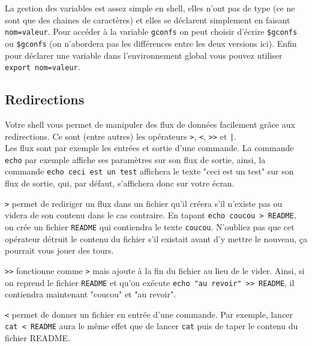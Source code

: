 \documentclass{article}
\begin{document}
La gestion des variables est assez simple en shell, elles n'ont pas de type (ce ne sont que des chaines de caractères) et elles se déclarent simplement en faisant \texttt{nom=valeur}.
Pour accéder à la variable \texttt{gconfs} on peut choisir d'écrire \texttt{\$gconfs} ou \texttt{\${gconfs}} (on n'abordera pas les différences entre les deux versions ici).
Enfin pour déclarer une variable dans l'environnement global vous pouvez utiliser \texttt{export nom=valeur}.

\subsection{Redirections}

Votre shell vous permet de manipuler des flux de données facilement grâce aux redirections.
Ce sont (entre autres) les opérateurs \texttt{>}, \texttt{<}, \texttt{>>} et \texttt{|}.\\

Les flux sont par exemple les entrées et sortie d'une commande. La commande \texttt{echo} par exemple affiche ses paramètres sur son flux de sortie, ainsi, la commande \texttt{echo ceci est un test} affichera le texte "ceci est un test" sur son flux de sortie, qui, par défaut, s'affichera donc sur votre écran.\\

\par \texttt{>} permet de rediriger un flux dans un fichier qu'il créera s'il n'existe pas ou videra de son contenu dans le cas contraire.
En tapant \texttt{echo coucou > README}, on crée un fichier \texttt{README} qui contiendra le texte \texttt{coucou}.
N'oubliez pas que cet opérateur détruit le contenu du fichier s'il existait avant d'y mettre le nouveau, ça pourrait vous jouer des tours.\\

\par \texttt{>>} fonctionne comme \texttt{>} mais ajoute à la fin du fichier au lieu de le vider.
Ainsi, si on reprend le fichier \texttt{README} et qu'on exécute \texttt{echo "au revoir" >> README}, il contiendra maintenant "coucou" et "au revoir".\\

\par \texttt{<} permet de donner un fichier en entrée d'une commande.
Par exemple, lancer \texttt{cat < README} aura le même effet que de lancer \texttt{cat} puis de taper le contenu du fichier README.\\
\end{document}

